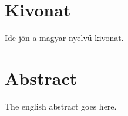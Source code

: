 \setcounter{page}{1}

\selecthungarian

\chapter*{Kivonat}

Ide jön a magyar nyelvű kivonat.

\vfill
\selectenglish


\chapter*{Abstract}

The english abstract goes here.

\vfill
\selectthesislanguage

\setcounter{romanPage}{\value{page}}
